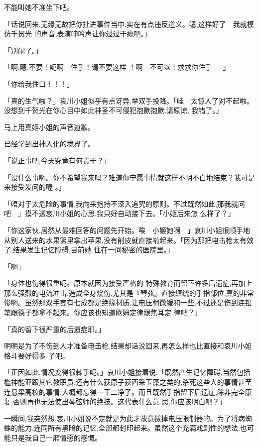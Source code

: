 \documentclass{article}
\begin{document}
不能叫她不准坐下吧。 

「话说回来,无缘无故把你扯进事件当中,实在有点违反道义。嗯,这样好了~~我就模仿千贺光
的声音,表演呻吟声让你过过干瘾吧。」 


「别闹了。」 

「啊,嗯,不要！呃啊~~住手！请不要这样
！啊~~不可以！求求你住手~~~」 


「你给我住口！！！」 

「真的生气啦？」哀川小姐似乎有点讶异,举双手投降。「哇~~太惊人了对不起啦。没想到千贺光在你心目中如此神圣不可侵犯抱歉抱歉,请原谅,
我错了。」 


马上用真姬小姐的声音道歉。 


\newpage

已经学到出神入化的境界了。 


「说正事吧,今天究竟有何贵干？」 

「没什么事啊。你不希望我来吗？难道你宁愿事情就这样不明不白地结束？我可是来接受发问的喔
。」 

「唔对于太危险的事情,我向来抱持不深入追究的原则。不过既然如此,那我就问吧~~」摸不透哀川小姐的心思,我只好自动接下去。「小姬后来怎
么样了？」 

「你这家伙,居然从最难回答的问题先开始。唉~~小姬她啊~~」哀川小姐很顺手地从别人送来的水果篮里拿出苹果,没有削皮就直接啃起来。「因为那把电击枪太有效了,结果发生记忆障碍,目前她
住在一间秘密的医院里。」 


「啊」 

「身体也伤得很重呢。原本就因为接受严格的
\newpage
特殊教育而留下许多后遗症,再加上那么强烈的电流冲击,造成全身烧伤,尤其是『琴弦』直接缠绕的手指部位,真的非常惨啊。虽然那双手套有七成都是绝缘材质,让电压稍微缓和一些,不过还是伤到连铅笔跟筷子都拿不起来。你应该也知道欧姆定律跟焦耳定
律吧？」 


「真的留下很严重的后遗症耶。」 

明明是为了不伤到人才准备电击枪,结果却话说回来,再怎么样也比直接和哀川小姐格斗要好得多
了吧。 

「正因如此,情况变得很棘手呢。」哀川小姐接着说:「既然产生记忆障碍,当然包括槛神能亚跟其它教职员,还有什么荻原子荻西采玉藻之类的,杀死这些人的事情甚至连悬梁高校的事情,大概都忘得一干二净了。而且既然手指留下后遗症,除非完全康复,否则再也无法使出琴弦师的绝技。这代表什么意
思,你应该明白吧？」 

\newpage

一瞬间,我突然想,哀川小姐说不定就是为此才故意拔掉电压限制器的。为了将病蜘蛛的能力,连同所有黑暗的记忆,全部都封印起来。虽然这个充满戏剧性的想法,也可能只是我自己一厢情愿的感慨。
\end{document}
